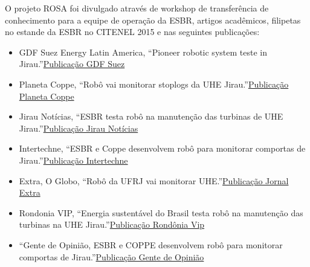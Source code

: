 O projeto ROSA foi divulgado através de workshop de transferência de
conhecimento para a equipe de operação da ESBR, artigos acadêmicos, filipetas no
estande da ESBR no CITENEL 2015 e nas seguintes publicações:

\begin{itemize}
\item GDF Suez Energy Latin America, ``Pioneer robotic system teste in
Jirau.''\href{https://www.engie.com/wp-content/uploads/2015/05/gdf-suez-second-supplement-may-21-2015.pdf}{Publicação
GDF Suez}
\item Planeta Coppe, ``Robô vai monitorar stoplogs da UHE
Jirau.''\href{http://www.planeta.coppe.ufrj.br/artigo.php?artigo=1837}{Publicação Planeta Coppe}
\item Jirau Notícias, ``ESBR testa robô na manutenção das turbinas de UHE
Jirau.''\href{}{Publicação Jirau Notícias}
\item Intertechne, ``ESBR e Coppe desenvolvem robô para monitorar comportas de
Jirau.''\href{http://www.intertechne.com.br/index.php?option=com_content&task=view&id=1120&Itemid=2}{Publicação
Intertechne}
\item Extra, O Globo, ``Robô da UFRJ vai monitorar
UHE.''\href{http://extra.globo.com/noticias/educacao/vida-de-calouro/robo-da-ufrj-vai-monitorar-usina-hidreletrica-jirau-13378837.html}{Publicação
Jornal Extra}
\item Rondonia VIP, ``Energia sustentável do Brasil testa robô na manutenção das
turbinas na UHE Jirau.''\href{http://www.jornalrondoniavip.com.br/noticia/energia-sustentavel-do-brasil-testa-robo-na-manutencao-das-turbinas-na-usina-hidreletrica-jirau,geral,16733.html}{Publicação Rondônia Vip}
\item ``Gente de Opinião, ESBR e COPPE desenvolvem robô para monitorar comportas
de
Jirau.''\href{http://www.gentedeopiniao.com.br/mobile/lerConteudoEnergia.php?news=127975}{Publicação Gente de Opinião}

\end{itemize}  
